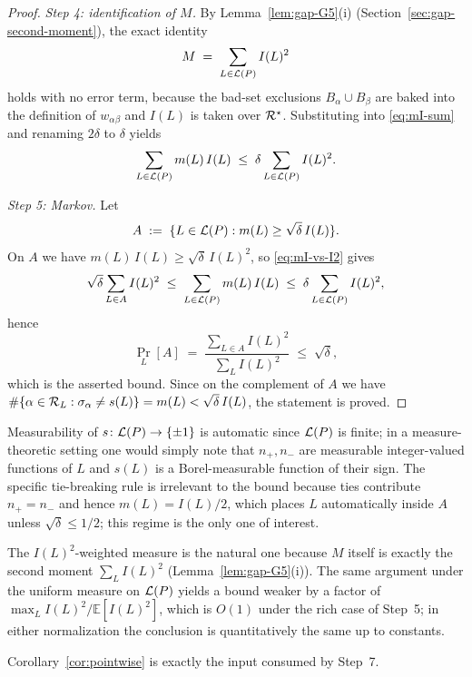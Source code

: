\begin{proof}
\smallskip\noindent\emph{Step 4: identification of $M$.}
By Lemma~\ref{lem:gap-G5}(i) (Section~\ref{sec:gap-second-moment}),
the exact identity
\[
  M \;=\;\sum_{L\in\mathcal{L}(P)} I(L)^2
\]
holds with no error term, because the bad-set exclusions
$B_\alpha\cup B_\beta$ are baked into the definition of $w_{\alpha\beta}$
and $I(L)$ is taken over $\mathcal{R}^\star$. Substituting into
\eqref{eq:mI-sum} and renaming $2\delta$ to $\delta$ yields
\begin{equation}\label{eq:mI-vs-I2}
  \sum_{L\in\mathcal{L}(P)} m(L)\,I(L)
  \;\le\;\delta\sum_{L\in\mathcal{L}(P)} I(L)^2.
\end{equation}

\smallskip\noindent\emph{Step 5: Markov.}
Let
\[
  A\;:=\;\{L\in\mathcal{L}(P):m(L)\ge\sqrt{\delta}\,I(L)\}.
\]
On $A$ we have $m(L)\,I(L)\ge\sqrt{\delta}\,I(L)^2$, so
\eqref{eq:mI-vs-I2} gives
\[
  \sqrt{\delta}\sum_{L\in A} I(L)^2
   \;\le\;\sum_{L\in\mathcal{L}(P)} m(L)\,I(L)
   \;\le\;\delta\sum_{L\in\mathcal{L}(P)} I(L)^2,
\]
hence
\[
  \Pr_L[A]
   \;=\;\frac{\sum_{L\in A} I(L)^2}{\sum_L I(L)^2}
   \;\le\;\sqrt{\delta},
\]
which is the asserted bound.  Since on the complement of $A$ we have
$\#\{\alpha\in\mathcal{R}_L:\sigma_\alpha\ne s(L)\}=m(L)<\sqrt{\delta}\,I(L)$,
the statement is proved.
\end{proof}

\begin{remark}
Measurability of $s\colon\mathcal{L}(P)\to\{\pm1\}$ is automatic since $\mathcal{L}(P)$
is finite; in a measure-theoretic setting one would simply note that
$n_+,n_-$ are measurable integer-valued functions of $L$ and $s(L)$ is
a Borel-measurable function of their sign.  The specific tie-breaking
rule is irrelevant to the bound because ties contribute $n_+=n_-$ and
hence $m(L)=I(L)/2$, which places $L$ automatically inside $A$ unless
$\sqrt{\delta}\le 1/2$; this regime is the only one of interest.
\end{remark}

\begin{remark}
The $I(L)^2$-weighted measure is the natural one because $M$ itself is
exactly the second moment $\sum_L I(L)^2$
(Lemma~\ref{lem:gap-G5}(i)).  The same
argument under the uniform measure on $\mathcal{L}(P)$ yields a bound weaker by
a factor of $\max_L I(L)^2 / \mathbb{E}[I(L)^2]$, which is $O(1)$ under
the rich case of Step~5; in either normalization the conclusion is
quantitatively the same up to constants.
\end{remark}


Corollary~\ref{cor:pointwise} is exactly the input consumed by Step~7.


